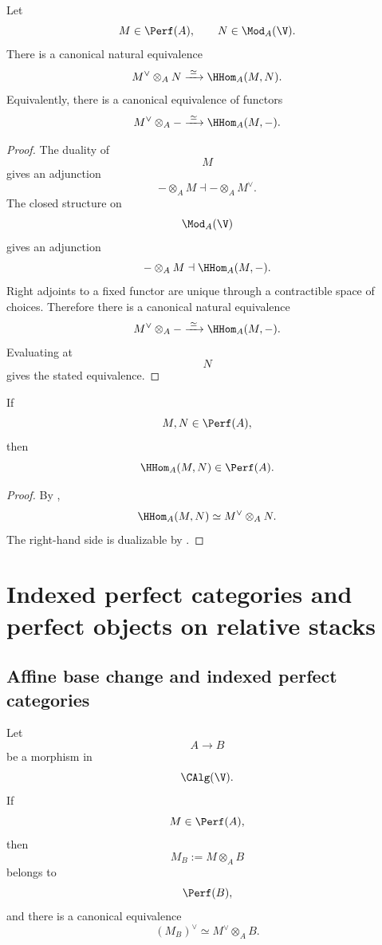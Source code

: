 \begin{theorem}
\label{thm:tensor-dual-internal-hom}
Let
\[
    M\in\Perf(A),
    \qquad
    N\in\Mod_A(\V).
\]
There is a canonical natural equivalence
\[
    M^\vee\otimes_A N
    \xrightarrow{\;\simeq\;}
    \HHom_A(M,N).
\]
Equivalently, there is a canonical equivalence of functors
\[
    M^\vee\otimes_A-
    \xrightarrow{\;\simeq\;}
    \HHom_A(M,-).
\]
\end{theorem}

\begin{proof}
The duality of
\[
    M
\]
gives an adjunction
\[
    -\otimes_A M
    \dashv
    -\otimes_A M^\vee.
\]
The closed structure on
\[
    \Mod_A(\V)
\]
gives an adjunction
\[
    -\otimes_A M
    \dashv
    \HHom_A(M,-).
\]
Right adjoints to a fixed functor are unique through a contractible space
of choices. Therefore there is a canonical natural equivalence
\[
    M^\vee\otimes_A-
    \xrightarrow{\;\simeq\;}
    \HHom_A(M,-).
\]
Evaluating at
\[
    N
\]
gives the stated equivalence.
\end{proof}

\begin{corollary}
\label{cor:perfect-internal-hom}
If
\[
    M,N\in\Perf(A),
\]
then
\[
    \HHom_A(M,N)
    \in
    \Perf(A).
\]
\end{corollary}

\begin{proof}
By
,
\[
    \HHom_A(M,N)
    \simeq
    M^\vee\otimes_A N.
\]
The right-hand side is dualizable by
.
\end{proof}

\section{Indexed perfect categories and perfect objects on relative stacks}
\label{sec:indexed-perfect-stacks}


\subsection{Affine base change and indexed perfect categories}

\begin{proposition}
\label{prop:base-change-perfect-modules}
Let
\[
    A
    \longrightarrow
    B
\]
be a morphism in
\[
    \CAlg(\V).
\]
If
\[
    M\in\Perf(A),
\]
then
\[
    M_B
    :=
    M\otimes_A B
\]
belongs to
\[
    \Perf(B),
\]
and there is a canonical equivalence
\[
    (M_B)^\vee
    \simeq
    M^\vee\otimes_A B.
\]
\end{proposition}

